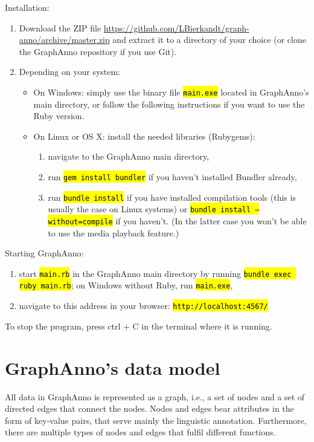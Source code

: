\documentclass[12pt]{scrartcl}
\newcommand{\code}[1]{\hl{\texttt{#1}}}
\begin{document}
\noindent
Installation:
\begin{enumerate}
	\item Download the ZIP file \url{https://github.com/LBierkandt/graph-anno/archive/master.zip} and extract it to a directory of your choice (or clone the GraphAnno repository if you use Git).
	\item Depending on your system:
		\begin{itemize}
			\item On Windows: simply use the binary file \code{main.exe} located in GraphAnno’s main directory, or follow the following instructions if you want to use the Ruby version.
			\item On Linux or OS X: install the needed libraries (Rubygems):
				\begin{enumerate}
					\item navigate to the GraphAnno main directory,
					\item run \code{gem install bundler} if you haven't installed Bundler already,
					\item run \code{bundle install} if you have installed compilation tools (this is usually the case on Linux systems) or \code{bundle install --without=compile} if you haven’t. (In the latter case you won’t be able to use the media playback feature.)
				\end{enumerate}
		\end{itemize}
\end{enumerate}

\noindent
Starting GraphAnno:
\begin{enumerate}
	\item start \code{main.rb} in the GraphAnno main directory by running \code{bundle exec ruby main.rb}; on Windows without Ruby, run \code{main.exe},
	\item navigate to this address in your browser: \code{http://localhost:4567/}
\end{enumerate}

\noindent
To stop the program, press ctrl + C in the terminal where it is running.



\section{GraphAnno’s data model}

All data in GraphAnno is represented as a graph, i.e., a set of nodes and a set of directed edges that connect the nodes.
Nodes and edges bear attributes in the form of key-value pairs, that serve mainly the linguistic annotation.
Furthermore, there are multiple types of nodes and edges that fulfil different functions.
\end{document}
